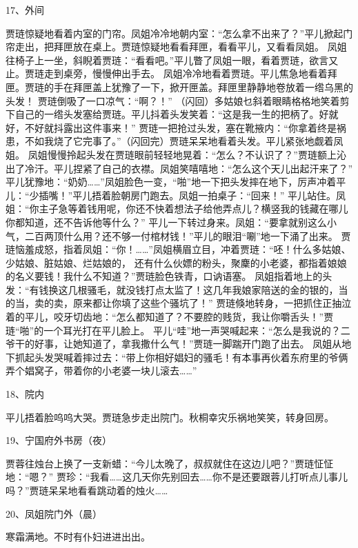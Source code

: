 17、外间\par
贾琏惊疑地看着内室的门帘。凤姐冷冷地朝内室：“怎么拿不出来了？”平儿掀起门帘走出，把拜匣放在桌上。贾琏惊疑地看看拜匣，看看平儿，又看看凤姐。
凤姐往椅子上一坐，斜睨着贾琏：“看看吧。”平儿瞥了凤姐一眼，看着贾琏，欲言又止。贾琏走到桌旁，慢慢伸出手去。
凤姐冷冷地看着贾琏。平儿焦急地看着拜匣。贾琏的手在拜匣盖上犹豫了一下，掀开匣盖。拜匣里静静地卷放着一绺乌黑的头发！
贾琏倒吸了一口凉气：“啊？！”
（闪回）多姑娘乜斜着眼睛格格地笑着剪下自己的一绺头发塞给贾琏。平儿抖着头发笑着：“这是我一生的把柄了。好就好，不好就抖露出这件事来！”
贾琏一把抢过头发，塞在靴掖内：“你拿着终是祸患，不如我烧了它完事了。”（闪回完）贾琏呆呆地看着头发。平儿紧张地觑着凤姐。
凤姐慢慢拎起头发在贾琏眼前轻轻地晃着：“怎么？不认识了？”贾琏额上沁出了冷汗。平儿捏紧了自己的衣襟。凤姐笑嘻嘻地：“怎么这个天儿出起汗来了？”
平儿犹豫地：“奶奶……”凤姐脸色一变，“啪”地一下把头发摔在地下，厉声冲着平儿：“少插嘴！”平儿捂着脸朝房门跑去。凤姐一拍桌子：“回来！”
平儿站住。凤姐：“你主子急等着钱用呢，你还不快着想法子给他弄点儿？横竖我的钱藏在哪儿你都知道，还不告诉他等什么？”
平儿一下转过身来。凤姐：“要拿就别这么小气，二百两顶什么用？还不够一付棺材钱！”平儿的眼泪“唰”地一下涌了出来。
贾琏恼羞成怒，指着凤姐：“你！……”凤姐横眉立目，冲着贾琏：“呸！什么多姑娘、少姑娘、脏姑娘、烂姑娘的，
还有什么伙嫖的粉头，聚麇的小老婆，都指着娘娘的名义要钱！我什么不知道？”贾琏脸色铁青，口讷语塞。
凤姐指着地上的头发：“有钱换这几根骚毛，就没钱打点太监了！这几年我娘家陪送的金的银的，当的当，卖的卖，原来都让你填了这些个骚坑了！”
贾琏倏地转身，一把抓住正抽泣着的平儿，咬牙切齿地：“怎么都知道了？不要腔的贱货，我让你嚼舌头！”贾琏“啪”的一个耳光打在平儿脸上。
平儿“哇”地一声哭喊起来：“怎么是我说的？二爷干的好事，让她知道了，拿我撒什么气！”贾琏一脚踹开门跑了出去。
凤姐从地下抓起头发哭喊着摔过去：“带上你相好娼妇的骚毛！有本事再伙着东府里的爷俩弄个娼窝子，带着你的小老婆一块儿滚去……”

18、院内\par
平儿捂着脸呜呜大哭。贾琏急步走出院门。秋桐幸灾乐祸地笑笑，转身回房。

19、宁国府外书房（夜）\par
贾蓉往烛台上换了一支新蜡：“今儿太晚了，叔叔就住在这边儿吧？”贾琏怔怔地：“嗯？”
贾珍：“我看……这几天你先别回去……你不是还要跟蓉儿打听点儿事儿吗？”贾琏呆呆地看看跳动着的烛火……

20、凤姐院门外（晨）\par
寒霜满地。不时有仆妇进进出出。

